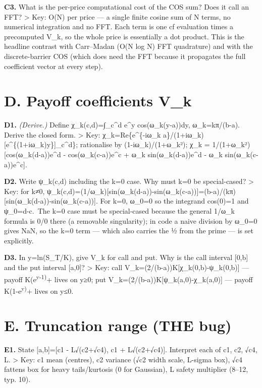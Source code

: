 \documentclass[
  11pt,
]{article}
\begin{document}
\textbf{C3.} What is the per-price computational cost of the COS sum?
Does it call an FFT? \textgreater{} Key: O(N) per price --- a single
finite cosine sum of N terms, no numerical integration and no FFT. Each
term is one cf evaluation times a precomputed V\_k, so the whole price
is essentially a dot product. This is the headline contrast with
Carr--Madan (O(N log N) FFT quadrature) and with the discrete-barrier
COS (which does need the FFT because it propagates the full coefficient
vector at every step).

\hypertarget{d.-payoff-coefficients-v_k}{%
\section{D. Payoff coefficients V\_k}\label{d.-payoff-coefficients-v_k}}

\textbf{D1.} \emph{(Derive.)} Define χ\_k(c,d)=∫\_c\^{}d e\^{}y
cos(ω\_k(y-a))dy, ω\_k=kπ/(b-a). Derive the closed form. \textgreater{}
Key: χ\_k=Re\{e\^{}\{-iω\_k a\}/(1+iω\_k)
{[}e\^{}\{(1+iω\_k)y\}{]}\_c\^{}d\}; rationalise by (1-iω\_k)/(1+ω\_k²);
χ\_k = 1/(1+ω\_k²){[}cos(ω\_k(d-a))e\^{}d - cos(ω\_k(c-a))e\^{}c + ω\_k
sin(ω\_k(d-a))e\^{}d - ω\_k sin(ω\_k(c-a))e\^{}c{]}.

\textbf{D2.} Write ψ\_k(c,d) including the k=0 case. Why must k=0 be
special-cased? \textgreater{} Key: for k≠0,
ψ\_k(c,d)=(1/ω\_k){[}sin(ω\_k(d-a))-sin(ω\_k(c-a)){]}=(b-a)/(kπ){[}sin(ω\_k(d-a))-sin(ω\_k(c-a)){]}.
For k=0, ω\_0=0 so the integrand cos(0)=1 and ψ\_0=d-c.~The k=0 case
must be special-cased because the general 1/ω\_k formula is 0/0 there (a
removable singularity); in code a naive division by ω\_0=0 gives NaN, so
the k=0 term --- which also carries the ½ from the prime --- is set
explicitly.

\textbf{D3.} In y=ln(S\_T/K), give V\_k for call and put. Why is the
call interval {[}0,b{]} and the put interval {[}a,0{]}? \textgreater{}
Key: call V\_k=(2/(b-a))K{[}χ\_k(0,b)-ψ\_k(0,b){]} --- payoff
K(e\textsuperscript{y-1)}+ lives on y≥0; put
V\_k=(2/(b-a))K{[}ψ\_k(a,0)-χ\_k(a,0){]} --- payoff
K(1-e\textsuperscript{y)}+ lives on y≤0.

\hypertarget{e.-truncation-range-the-bug}{%
\section{E. Truncation range (THE
bug)}\label{e.-truncation-range-the-bug}}

\textbf{E1.} State {[}a,b{]}={[}c1 - L√(c2+√c4), c1 + L√(c2+√c4){]}.
Interpret each of c1, c2, √c4, L. \textgreater{} Key: c1 mean (centres),
c2 variance (√c2 width scale, L-sigma box), √c4 fattens box for heavy
tails/kurtosis (0 for Gaussian), L safety multiplier (8--12, typ. 10).
\end{document}
